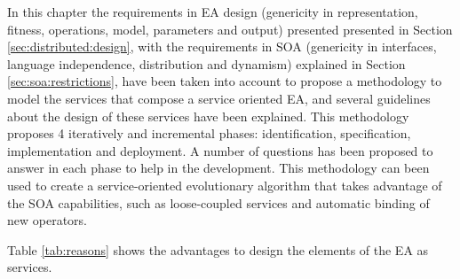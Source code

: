 In this chapter the requirements in EA design (genericity in representation, fitness, operations, model, parameters and output) presented presented in Section \ref{sec:distributed:design}, with the requirements in SOA (genericity in interfaces, language independence, distribution and dynamism) explained in Section \ref{sec:soa:restrictions}, have been taken into account to propose a methodology to model the services that compose a service oriented EA, and several guidelines about the design of these services have been explained. This methodology proposes 4 iteratively and incremental phases: identification, specification, implementation and deployment. A number of questions has been proposed to answer in each phase to help in the development. This methodology can been used to create a service-oriented evolutionary algorithm that takes advantage of the SOA capabilities, such as loose-coupled services and automatic binding of new operators. 



Table \ref{tab:reasons} shows the advantages to design the elements of the EA as services.


